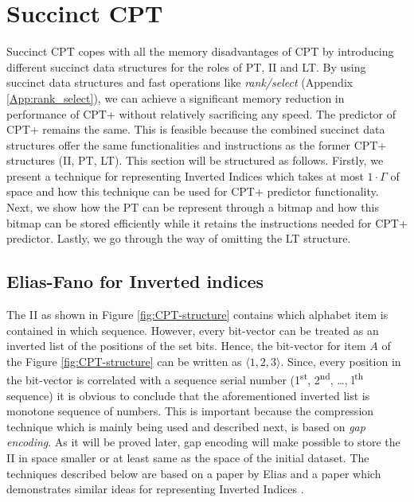 \section{Succinct CPT}\label{ccpt}
Succinct CPT copes with all the memory disadvantages of CPT by introducing different succinct data structures for the roles of PT, II and LT. By using succinct data structures and fast operations like \emph{rank/select} (Appendix \ref{App:rank_select}), we can achieve a significant memory reduction in performance of CPT+ without relatively sacrificing any speed. The predictor of CPT+ remains the same. This is feasible because the combined succinct data structures offer the same functionalities and instructions as the former CPT+ structures (II, PT, LT). This section will be structured as follows. Firstly,  we present a technique for representing Inverted Indices which takes at most $1\cdot \Gamma$ of space and how this technique can be used for CPT+ predictor functionality. Next, we show how the PT can be represent through a bitmap and how this bitmap can be stored efficiently while it retains the instructions needed for CPT+ predictor. Lastly, we go through the way of omitting the LT structure.
\subsection{Elias-Fano for Inverted indices}\label{elicas_fano}
The II as shown in Figure \ref{fig:CPT-structure} contains which alphabet item is contained in which sequence. However, every bit-vector can be treated as an inverted list of the positions of the set bits. Hence, the bit-vector for item \(A\) of the Figure \ref{fig:CPT-structure} can be written as \(\langle 1, 2, 3\rangle\). Since, every position in the bit-vector is correlated with a sequence serial number (1\textsuperscript{st}, 2\textsuperscript{nd}, \dots, l\textsuperscript{th} sequence) it is obvious to conclude that the aforementioned inverted list is monotone sequence of numbers. This is important because  the compression technique which is mainly being used and described next, is based on \emph{gap encoding}. As it will be proved later, gap encoding will make possible to store the II in space smaller or at least same as the space of the initial dataset. The techniques described below are based on a paper by Elias \cite{elias_efficient_1974} and a paper which demonstrates similar ideas for representing Inverted Indices \cite{vigna_quasi-succinct_2013}.
